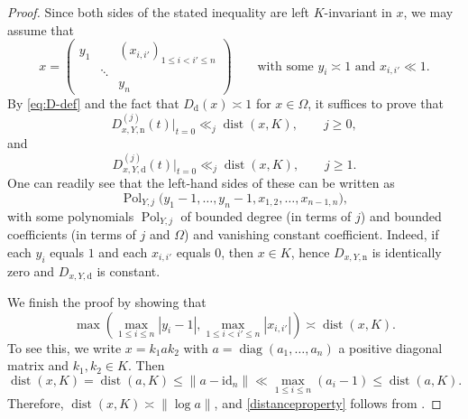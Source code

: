 \documentclass[11pt,oneside]{amsart}
\numberwithin{equation}{section}
\theoremstyle{remark}
\theoremstyle{plain}
\DeclareMathOperator{\diag}{diag}
\DeclareMathOperator{\dist}{dist}
\DeclareMathOperator{\Pol}{Pol}
\newcommand\id{\mathrm{id}}
\renewcommand\leq{\leqslant}
\renewcommand\geq{\geqslant}
\begin{document}
\begin{proof}
Since both sides of the stated inequality are left $K$-invariant in $x$, we may assume that
\begin{equation}\label{m}
x=\begin{pmatrix} y_1 & & (x_{i,i'})_{1\leq i<i'\leq n} \\ & \ddots & \\ & & y_n \end{pmatrix}\qquad \text{with some $y_i\asymp 1$ and $x_{i,i'}\ll 1$}.
\end{equation}
By \eqref{eq:D-def} and the fact that $D_{\text{d}}(x)\asymp 1$ for $x\in\Omega$, it suffices to prove that
\[
D_{x,Y,\text{n}}^{(j)}(t)|_{t=0} \ll_{j} \dist(x,K), \qquad j \geq 0,
\]
and
\[
D_{x,Y,\text{d}}^{(j)}(t)|_{t=0} \ll_{j} \dist(x,K), \qquad j \geq 1. 
\]
One can readily see that the left-hand sides of these can be written as
\[
\Pol_{Y,j}\bigl(y_1-1,\dotsc,y_{n}-1,x_{1,2},\dotsc,x_{n-1,n}\bigr),
\]
with some polynomials $\Pol_{Y,j}$ of bounded degree (in terms of $j$) and bounded coefficients (in terms of $j$ and $\Omega$) and vanishing constant coefficient. Indeed, if each $y_i$ equals $1$ and each $x_{i, i'}$ equals $0$, then $x \in K$, hence $D_{x,Y,\text{n}}$ is identically zero and $D_{x,Y,\text{d}}$ is constant.

We finish the proof by showing that
\begin{equation}\label{distanceproperty}
\max\left(\max_{1 \leq i \leq n} |y_i - 1|,\max_{1\leq i<i'\leq n}|x_{i,i'}|\right)\asymp\dist(x,K).
\end{equation}
To see this, we write $x=k_1ak_2$ with $a=\diag(a_1,\dotsc,a_n)$ a positive diagonal matrix and $k_1,k_2\in K$. Then
\[\dist(x,K)=\dist(a,K)\leq\|a-\id_n\|\ll\max_{1\leq i\leq n}(a_i-1)\leq\dist(a,K).\]
Therefore, $\dist(x,K)\asymp\|\log a\|$, and \eqref{distanceproperty} follows from \cite[Lem.~3]{BlomerHarcosMaga2019}.
\end{proof}
\end{document}
